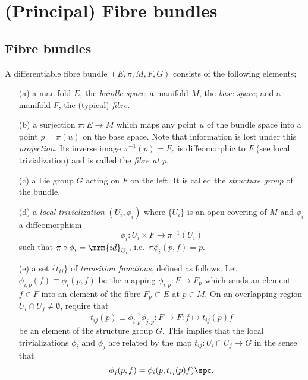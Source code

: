 \documentclass[10pt,reqno]{amsart}
\numberwithin{equation}{section}
\begin{document}

\section{(Principal) Fibre bundles}

\subsection{Fibre bundles}

\begin{definition}
	\label{def:fibre_bundle}
	A differentiable fibre bundle $(E,\pi,M,F,G)$ consists of the 
	following elements;
	\begin{itemize}
		\item[(a)] a manifold $E$, the \emph{bundle space}; a 
			manifold $M$, the \emph{base space}; and a manifold $F$, 
			the (typical) \emph{fibre}.
		\item[(b)] a surjection $\pi : E \rightarrow M$ which maps 
			any point $u$ of the bundle space into a point $p = \pi(u)$ 
			on the base space.  Note that information is lost under 
			this \emph{projection}.  Its inverse image $\pi^{-1}(p) = 
			F_p$ is diffeomorphic to $F$ (see local trivialization) and 
			is called the \emph{fibre at $p$}.
		\item[(c)] a Lie group $G$ acting on $F$ on the left. It is 
			called the \emph{structure group} of the bundle.
		\item[(d)] a \emph{local trivialization} $(U_i,\phi_i)$ where 
			$\{U_i\}$ is an open covering of $M$ and $\phi_i$ a 
			diffeomorphism
			\begin{equation}
	\phi_i : U_i \times F \rightarrow \pi^{-1}(U_i)
			\end{equation}
			such that $\pi \circ \phi_i = \mrm{id}_{U_i}$, i.e.\ 
			$\pi\phi_i(p,f) = p$.
		\item[(e)] a set $\{t_{ij}\}$ of \emph{transition functions}, 
			defined as follows. Let $\phi_{i,p}(f) \equiv \phi_i(p,f)$ 
			be the mapping $\phi_{i,p} : F \rightarrow F_p$ which sends 
			an element $f \in F$ into an element of the fibre $F_p 
			\subset E$ at $p \in M$. On an overlapping region $U_i \cap 
			U_j \neq \emptyset$, require that
			\begin{equation}
	t_{ij}(p) \equiv \phi_{i,p}^{-1} \phi_{j,p} : F \rightarrow F :
	f \mapsto t_{ij}(p)f
			\end{equation}
			be an element of the structure group $G$. This implies that 
			the local trivializations $\phi_i$ and $\phi_j$ are related 
			by the map $t_{ij} : U_i \cap U_j \rightarrow G$ in the 
			sense that
			\begin{equation}
	\phi_j(p,f) = \phi_i(p,t_{ij}(p)f)\spc .
			\end{equation}
	\end{itemize}
\end{definition}
\end{document}
